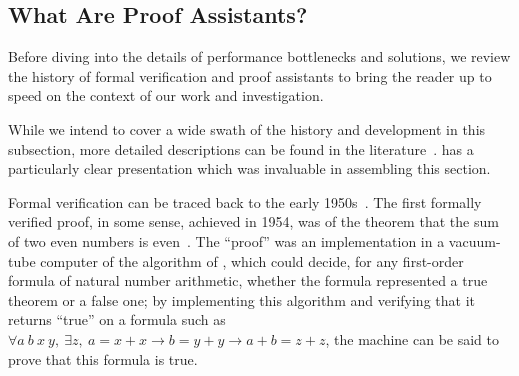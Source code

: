 \subsection{What Are Proof Assistants?}\label{sec:intro:history}
%
Before diving into the details of performance bottlenecks and solutions, we review the history of formal verification and proof assistants to bring the reader up to speed on the context of our work and investigation.





While we intend to cover a wide swath of the history and development in this subsection, more detailed descriptions can be found in the literature~\cites{ringer2020qed,Proof2009Geuvers,History2014Harrison,CoqArtForward2013Huet,Brief2019Darbari,davis2001early,Matuszewski05mizar:the,Automath2002Kamareddine,Milestones2019Moore,Automation2013Moore,LCF2000Gordon,LCF2019Paulson,Logical2002Pfenning}[Related Work]{nuprl}.
\textcite[ch.~4]{ringer2020qed} has a particularly clear presentation which was invaluable in assembling this section.

Formal verification can be traced back to the early 1950s~\cite{Brief2019Darbari}.
The first formally verified proof, in some sense, achieved in 1954, was of the theorem that the sum of two even numbers is even~\cite{davis2001early}.
The ``proof'' was an implementation in a vacuum-tube computer of the algorithm of \textcite{Uber1929Presburger}, which could decide, for any first-order formula of natural number arithmetic, whether the formula represented a true theorem or a false one;
by implementing this algorithm and verifying that it returns ``true'' on a formula such as $\forall a\ b\ x\ y,\ \exists z,\ a = x + x \to b = y + y \to a + b = z + z$, the machine can be said to prove that this formula is true.

